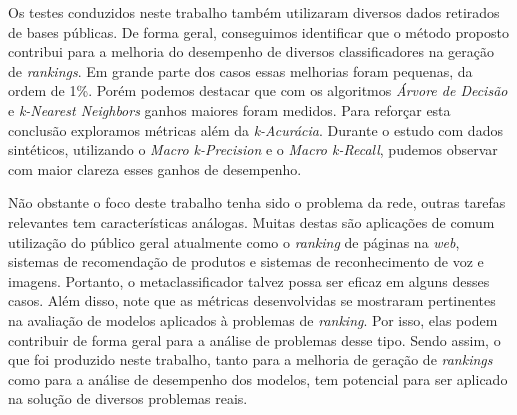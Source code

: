 Os testes conduzidos neste trabalho também utilizaram diversos dados retirados de bases públicas.
De forma geral, conseguimos identificar que o método proposto contribui para a melhoria do desempenho de diversos classificadores na geração de \textit{rankings}.
Em grande parte dos casos essas melhorias foram pequenas, da ordem de 1\%.
Porém podemos destacar que com os algoritmos \textit{Árvore de Decisão} e \textit{k-Nearest Neighbors} ganhos maiores foram medidos.
Para reforçar esta conclusão exploramos métricas além da \textit{k-Acurácia}.
Durante o estudo com dados sintéticos, utilizando o \textit{Macro k-Precision} e o \textit{Macro k-Recall}, pudemos observar com maior clareza esses ganhos de desempenho.

Não obstante o foco deste trabalho tenha sido o problema da rede, outras tarefas relevantes tem características análogas.
Muitas destas são aplicações de comum utilização do público geral atualmente como o \textit{ranking} de páginas na \textit{web}, sistemas de recomendação de produtos e sistemas de reconhecimento de voz e imagens.
Portanto, o metaclassificador talvez possa ser eficaz em alguns desses casos.
Além disso, note que as métricas desenvolvidas se mostraram pertinentes na avaliação de modelos aplicados à problemas de \textit{ranking}.
Por isso, elas podem contribuir de forma geral para a análise de problemas desse tipo.
Sendo assim, o que foi produzido neste trabalho, tanto para a melhoria de geração de \textit{rankings} como para a análise de desempenho dos modelos, tem potencial para ser aplicado na solução de diversos problemas reais.
